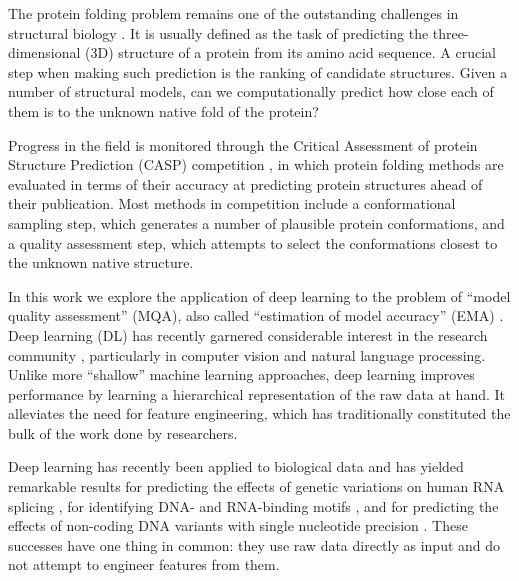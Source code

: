 \documentclass{bioinfo}
\begin{document}
The protein folding problem remains one of the outstanding challenges
in structural biology \citep{dill2012folding}.  It is usually defined
as the task of predicting the three-dimensional (3D) structure of a
protein from its amino acid sequence. A crucial step when making such
prediction is the ranking of candidate structures. Given a number of
structural models, can we computationally predict how close each of
them is to the unknown native fold of the protein?

Progress in the field is monitored through the Critical Assessment of
protein Structure Prediction (CASP) competition \citep{moult1995large},
in which protein folding methods are evaluated in terms of their
accuracy at predicting protein structures ahead of their
publication. Most methods in competition include a conformational
sampling step, which generates a number of plausible protein
conformations, and a quality assessment step, which attempts to select
the conformations closest to the unknown native structure.

In this work we explore the application of deep learning to the
problem of ``model quality assessment'' (MQA), also called
``estimation of model accuracy'' (EMA) \citep{kryshtafovych2015}. Deep
learning (DL) has recently garnered considerable interest in the
research community \citep{lecun2015deep}, particularly in computer
vision and natural language processing. Unlike more ``shallow''
machine learning approaches, deep learning improves performance by
learning a hierarchical representation of the raw data at hand. It
alleviates the need for feature engineering, which has traditionally
constituted the bulk of the work done by researchers.

Deep learning has recently been applied to biological data and has
yielded remarkable results for predicting the effects of genetic
variations on human RNA splicing \citep{xiong2015human}, for
identifying DNA- and RNA-binding
motifs \citep{alipanahi2015predicting}, and for predicting the effects
of non-coding DNA variants with single nucleotide
precision \citep{zhou2015predicting}. These successes have one thing in
common: they use raw data directly as input and do not attempt to
engineer features from them.
\end{document}
